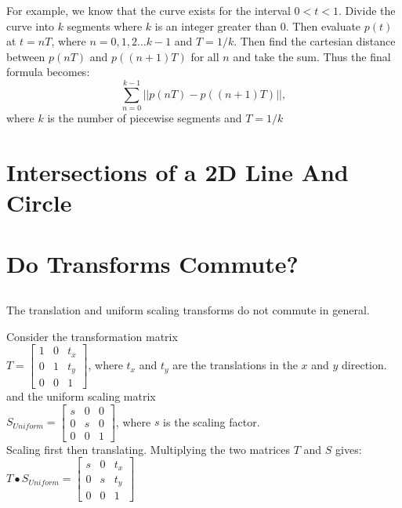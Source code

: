 \documentclass[a4paper,10pt]{scrartcl}
\begin{document}
For example, we know that the curve exists for the interval $0 < t < 1$. Divide the curve into $k$ segments where $k$ is an integer greater than 0.
Then evaluate $p(t)$ at $t = nT$, where $n = 0,1,2 \ldots k-1$ and $T = 1/k$. Then find the cartesian distance between
$p(nT)$ and $p((n+1)T)$ for all $n$ and take the sum. Thus the final formula becomes:\\
\[
\sum_{n=0}^{k-1}
  ||p(nT) - p((n+1)T)||,\] where $k$ is the number of piecewise segments and $T = 1/k$

\section{Intersections of a 2D Line And Circle}

\section{Do Transforms Commute?}

\subsection{}

The translation and uniform scaling transforms do not commute in general.

Consider the transformation matrix \\

$T = 
\begin{bmatrix}
    1       & 0 & t_x \\
    0       & 1 & t_y \\
    0       & 0 & 1 
\end{bmatrix}
$, where $t_x $ and $t_y$ are the translations in the $x$ and $y$ direction. \\

and the uniform scaling matrix \\

$S_{Uniform} = \begin{bmatrix}
    s       & 0 & 0 \\
    0       & s & 0 \\
    0       & 0 & 1     
 \end{bmatrix}
$, where $s$ is the scaling factor. \\

Scaling first then translating. Multiplying the two matrices $T$ and $S$ gives: \\

$T \bullet S_{Uniform} = \begin{bmatrix}
		  s & 0 & t_x \\
		  0 & s & t_y \\
		  0 & 0 & 1
               \end{bmatrix}
$ \\
\end{document}
